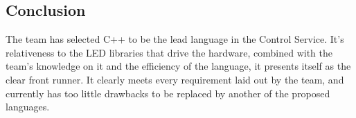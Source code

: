 \documentclass[onecolumn, draftclsnofoot,10pt, compsoc]{IEEEtran}
\begin{document}
			\subsection{Conclusion}
			The team has selected C++ to be the lead language in the Control Service.  It's relativeness to the LED libraries that drive the hardware, combined with the team's knowledge on it and
			the efficiency of the language, it presents itself as the clear front runner.  It clearly meets every requirement laid out by the team, and currently has too little drawbacks to be replaced
			by another of the proposed languages.

		
		
\end{document}
